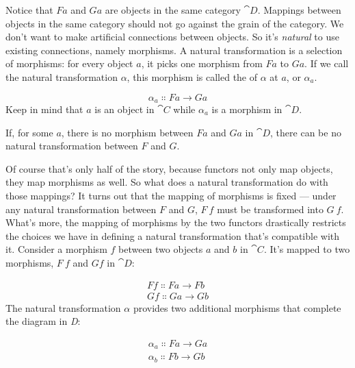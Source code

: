 \noindent
Notice that $F a$ and $G a$ are objects in the same
category $\cat{D}$. Mappings between objects in the same category should
not go against the grain of the category. We don't want to make
artificial connections between objects. So it's \emph{natural} to use
existing connections, namely morphisms. A natural transformation is a
selection of morphisms: for every object $a$, it picks one
morphism from $F a$ to $G a$. If we call the natural
transformation $\alpha$, this morphism is called the 
of $\alpha$ at $a$, or $\alpha_a$.

\[\alpha_a \Colon F a \to G a\]
Keep in mind that $a$ is an object in $\cat{C}$ while $\alpha_a$
is a morphism in $\cat{D}$.

If, for some $a$, there is no morphism between $F a$ and
$G a$ in $\cat{D}$, there can be no natural transformation
between $F$ and $G$.

Of course that's only half of the story, because functors not only map
objects, they map morphisms as well. So what does a natural
transformation do with those mappings? It turns out that the mapping of
morphisms is fixed --- under any natural transformation between $F$ and $G$,
$F\ f$ must be transformed into $G\ f$. What's more, the
mapping of morphisms by the two functors drastically restricts the
choices we have in defining a natural transformation that's compatible
with it. Consider a morphism $f$ between two objects $a$
and $b$ in $\cat{C}$. It's mapped to two morphisms, $F\ f$
and $G f$ in $\cat{D}$:

\begin{gather*}
F f \Colon F a \to F b \\
G f \Colon G a \to G b
\end{gather*}
The natural transformation $\alpha$ provides two additional morphisms
that complete the diagram in \emph{D}:

\begin{gather*}
\alpha_a \Colon F a \to G a \\
\alpha_b \Colon F b \to G b
\end{gather*}

\begin{figure}[H]
\centering
{}
\end{figure}

